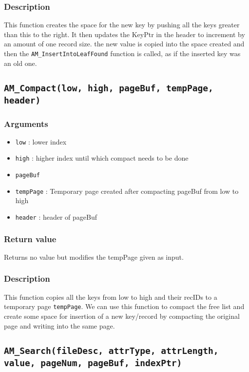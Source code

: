 \documentclass[a4paper, 12pt]{article}
\begin{document}
\subsubsection{Description}
This function creates the space for the new key by pushing all the keys greater than this to the right. It then updates the KeyPtr in the header to increment by an amount of one record size. the new value is copied into the space created and then the \texttt{AM\_InsertIntoLeafFound} function is called, as if the inserted key was an old one.

\subsection{\texttt{AM\_Compact(low, high, pageBuf, tempPage, header)}}
\subsubsection{Arguments}
\begin{itemize}
	\item{\texttt{low} : lower index}
	\item{\texttt{high} : higher index until which compact needs to be done}
	\item{\texttt{pageBuf}}
	\item{\texttt{tempPage} : Temporary page created after compacting pageBuf from low to high}
	\item{\texttt{header} : header of pageBuf}
\end{itemize}
\subsubsection{Return value}
Returns no value but modifies the tempPage given as input.
\subsubsection{Description}
This function copies all the keys from low to high and their recIDs to a temporary page \texttt{tempPage}. We can use this function to compact the free list and create some space for insertion of a new key/record by compacting the original page and writing into the same page.

\subsection{\texttt{AM\_Search(fileDesc, attrType, attrLength, value, pageNum, pageBuf, indexPtr)}}
\end{document}
